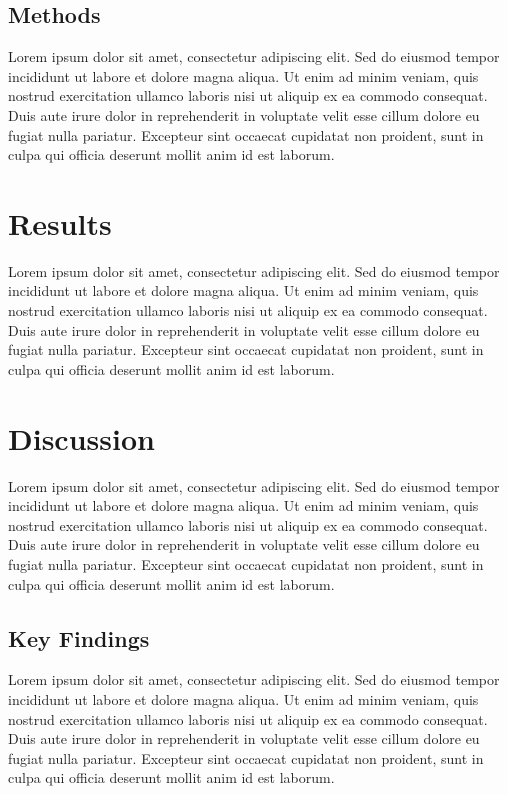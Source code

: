 \documentclass[
  12pt,
]{article}
\begin{document}
\subsection{Methods}\label{methods}

Lorem ipsum dolor sit amet, consectetur adipiscing elit. Sed do eiusmod
tempor incididunt ut labore et dolore magna aliqua. Ut enim ad minim
veniam, quis nostrud exercitation ullamco laboris nisi ut aliquip ex ea
commodo consequat. Duis aute irure dolor in reprehenderit in voluptate
velit esse cillum dolore eu fugiat nulla pariatur. Excepteur sint
occaecat cupidatat non proident, sunt in culpa qui officia deserunt
mollit anim id est laborum.

\section{Results}\label{results}

Lorem ipsum dolor sit amet, consectetur adipiscing elit. Sed do eiusmod
tempor incididunt ut labore et dolore magna aliqua. Ut enim ad minim
veniam, quis nostrud exercitation ullamco laboris nisi ut aliquip ex ea
commodo consequat. Duis aute irure dolor in reprehenderit in voluptate
velit esse cillum dolore eu fugiat nulla pariatur. Excepteur sint
occaecat cupidatat non proident, sunt in culpa qui officia deserunt
mollit anim id est laborum.

\section{Discussion}\label{discussion}

Lorem ipsum dolor sit amet, consectetur adipiscing elit. Sed do eiusmod
tempor incididunt ut labore et dolore magna aliqua. Ut enim ad minim
veniam, quis nostrud exercitation ullamco laboris nisi ut aliquip ex ea
commodo consequat. Duis aute irure dolor in reprehenderit in voluptate
velit esse cillum dolore eu fugiat nulla pariatur. Excepteur sint
occaecat cupidatat non proident, sunt in culpa qui officia deserunt
mollit anim id est laborum.

\subsection{Key Findings}\label{key-findings}

Lorem ipsum dolor sit amet, consectetur adipiscing elit. Sed do eiusmod
tempor incididunt ut labore et dolore magna aliqua. Ut enim ad minim
veniam, quis nostrud exercitation ullamco laboris nisi ut aliquip ex ea
commodo consequat. Duis aute irure dolor in reprehenderit in voluptate
velit esse cillum dolore eu fugiat nulla pariatur. Excepteur sint
occaecat cupidatat non proident, sunt in culpa qui officia deserunt
mollit anim id est laborum.
\end{document}
